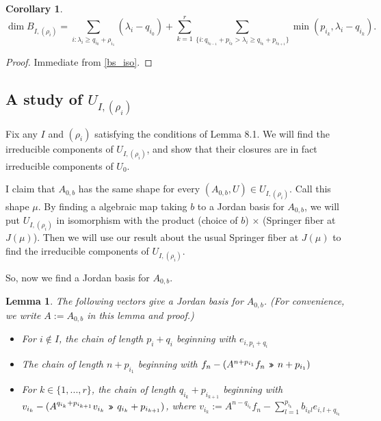\documentclass[12pt,psamsfonts]{article}
\newcommand{\leftshift}{\,\texttt{<<}\,}
\newcommand{\rightshift}{\mathbin{\rotatebox[origin=c]{180}{\leftshift}}}
\newtheorem{lemma}[theorem]{Lemma}
\newtheorem{corollary}[theorem]{Corollary}
\begin{document}
\begin{corollary}\label{bs_dim}
    \[\dim B_{I, (\rho_i)} = \sum_{i : \lambda_i \geq q_{i_0} + \rho_{i_1}} (\lambda_i - q_{i_0}) + \sum_{k = 1}^r \sum_{\{i : q_{i_{k - 1}} + p_{i_k} > \lambda_i \geq q_{i_k} + p_{i_{k + 1}}\}} \min(p_{i_k}, \lambda_i - q_{i_k}).\]
\end{corollary}
\begin{proof}
    Immediate from \cref{bs_iso}.
\end{proof}

\subsection{A study of \(U_{I, (\rho_i)}\)}
Fix any \(I\) and \((\rho_i)\) satisfying the conditions of Lemma 8.1.
We will find the irreducible components of \(U_{I, (\rho_i)}\), and show that their closures are in fact irreducible components of \(U_0\).
\par I claim that \(A_{0,b}\) has the same shape for every \((A_{0, b}, U) \in U_{I, (\rho_i)}\).
Call this shape \(\mu\).
By finding a algebraic map taking \(b\) to a Jordan basis for \(A_{0,b}\), we will put \(U_{I, (\rho_i)}\) in isomorphism with the product (choice of \(b\)) \(\times\) (Springer fiber at \(J(\mu)\)).
Then we will use our result about the usual Springer fiber at \(J(\mu)\) to find the irreducible components of \(U_{I, (\rho_i)}\).
\par So, now we find a Jordan basis for \(A_{0, b}\).
\begin{lemma}
    The following vectors give a Jordan basis for \(A_{0,b}\).
    (For convenience, we write \(A := A_{0,b}\) in this lemma and proof.)
    \begin{itemize}
        \item For \(i \notin I\), the chain of length \(p_i + q_i\) beginning with \(e_{i, p_i + q_i}\)
        \item The chain of length \(n + p_{i_1}\) beginning with \(f_n - (A^{n + p_{i_1}}f_n \rightshift n + p_{i_1})\)
        \item For \(k \in \{1, ..., r\}\), the chain of length \(q_{i_k} + p_{i_{k + 1}}\) beginning with \(v_{i_k} - (A^{q_{i_k} + p_{i_{k + 1}}} v_{i_k} \rightshift q_{i_k} + p_{i_{k + 1}})\), where \(v_{i_k} := A^{n - q_{i_k}} f_n - \sum_{l = 1}^{p_{i_k}} b_{i_kl} e_{i,l + q_{i_k}}\)
    \end{itemize}
\end{lemma}
\end{document}
